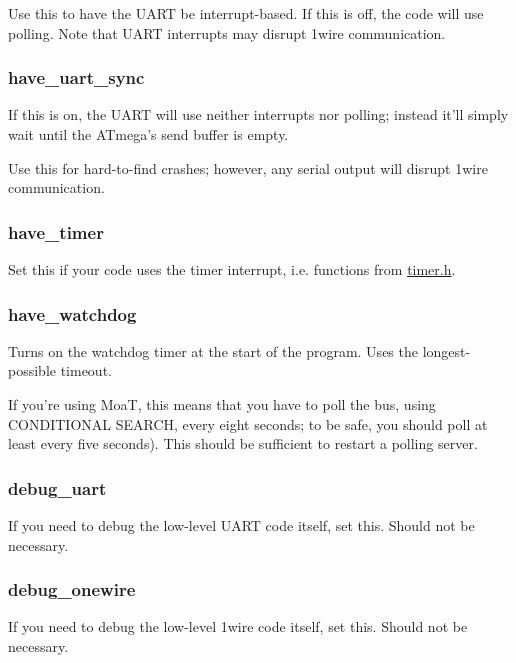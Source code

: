 Use this to have the U\-A\-R\-T be interrupt-\/based. If this is off, the code will use polling. Note that U\-A\-R\-T interrupts may disrupt 1wire communication.

\subsubsection*{{\ttfamily have\-\_\-uart\-\_\-sync}}

If this is on, the U\-A\-R\-T will use neither interrupts nor polling; instead it'll simply wait until the A\-Tmega's send buffer is empty.

Use this for hard-\/to-\/find crashes; however, any serial output will disrupt 1wire communication.

\subsubsection*{{\ttfamily have\-\_\-timer}}

Set this if your code uses the timer interrupt, i.\-e. functions from {\ttfamily \hyperlink{timer_8h}{timer.\-h}}.

\subsubsection*{{\ttfamily have\-\_\-watchdog}}

Turns on the watchdog timer at the start of the program. Uses the longest-\/possible timeout.

If you're using Moa\-T, this means that you have to poll the bus, using C\-O\-N\-D\-I\-T\-I\-O\-N\-A\-L S\-E\-A\-R\-C\-H, every eight seconds; to be safe, you should poll at least every five seconds). This should be sufficient to restart a polling server.

\subsubsection*{{\ttfamily debug\-\_\-uart}}

If you need to debug the low-\/level U\-A\-R\-T code itself, set this. Should not be necessary.

\subsubsection*{{\ttfamily debug\-\_\-onewire}}

If you need to debug the low-\/level 1wire code itself, set this. Should not be necessary.

